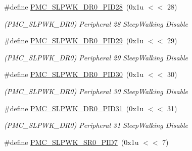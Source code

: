 \begin{DoxyCompactItemize}
\mbox{\label{group__SAME70__PMC_ga101ebe9b346860a4308e825640c16ae0}} 
\#define \mbox{\hyperlink{group__SAME70__PMC_ga101ebe9b346860a4308e825640c16ae0}{P\+M\+C\+\_\+\+S\+L\+P\+W\+K\+\_\+\+D\+R0\+\_\+\+P\+I\+D28}}~(0x1u $<$$<$ 28)
\begin{DoxyCompactList}\small\item\em (P\+M\+C\+\_\+\+S\+L\+P\+W\+K\+\_\+\+D\+R0) Peripheral 28 Sleep\+Walking Disable \end{DoxyCompactList}\item 
\mbox{\label{group__SAME70__PMC_gabbf17fd219ae47df8d9adfc09818b8ff}} 
\#define \mbox{\hyperlink{group__SAME70__PMC_gabbf17fd219ae47df8d9adfc09818b8ff}{P\+M\+C\+\_\+\+S\+L\+P\+W\+K\+\_\+\+D\+R0\+\_\+\+P\+I\+D29}}~(0x1u $<$$<$ 29)
\begin{DoxyCompactList}\small\item\em (P\+M\+C\+\_\+\+S\+L\+P\+W\+K\+\_\+\+D\+R0) Peripheral 29 Sleep\+Walking Disable \end{DoxyCompactList}\item 
\mbox{\label{group__SAME70__PMC_gadb8361edd29501c31639b29d439a7442}} 
\#define \mbox{\hyperlink{group__SAME70__PMC_gadb8361edd29501c31639b29d439a7442}{P\+M\+C\+\_\+\+S\+L\+P\+W\+K\+\_\+\+D\+R0\+\_\+\+P\+I\+D30}}~(0x1u $<$$<$ 30)
\begin{DoxyCompactList}\small\item\em (P\+M\+C\+\_\+\+S\+L\+P\+W\+K\+\_\+\+D\+R0) Peripheral 30 Sleep\+Walking Disable \end{DoxyCompactList}\item 
\mbox{\label{group__SAME70__PMC_ga535a859388caa8385073eb68e7150bb7}} 
\#define \mbox{\hyperlink{group__SAME70__PMC_ga535a859388caa8385073eb68e7150bb7}{P\+M\+C\+\_\+\+S\+L\+P\+W\+K\+\_\+\+D\+R0\+\_\+\+P\+I\+D31}}~(0x1u $<$$<$ 31)
\begin{DoxyCompactList}\small\item\em (P\+M\+C\+\_\+\+S\+L\+P\+W\+K\+\_\+\+D\+R0) Peripheral 31 Sleep\+Walking Disable \end{DoxyCompactList}\item 
\mbox{\label{group__SAME70__PMC_ga6771914b09a260b40845efd5c09dc42b}} 
\#define \mbox{\hyperlink{group__SAME70__PMC_ga6771914b09a260b40845efd5c09dc42b}{P\+M\+C\+\_\+\+S\+L\+P\+W\+K\+\_\+\+S\+R0\+\_\+\+P\+I\+D7}}~(0x1u $<$$<$ 7)
$$
\end{DoxyCompactItemize}
